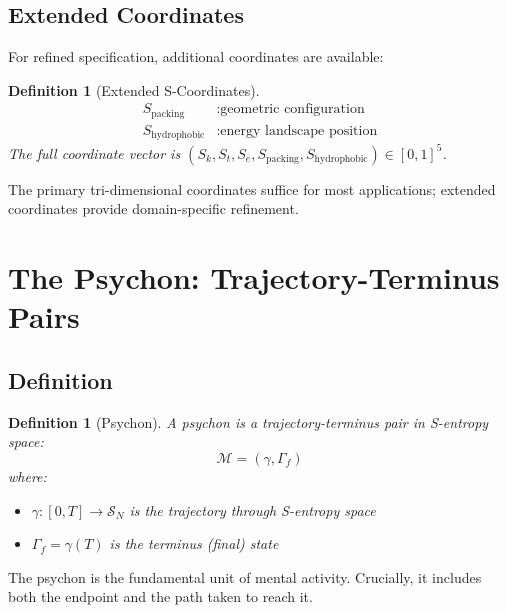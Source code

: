 \documentclass[twocolumn,amsmath,amssymb,aps,prl,superscriptaddress]{revtex4-2}
\newtheorem{definition}[theorem]{Definition}
\newcommand{\Sspace}{\mathcal{S}}
\newcommand{\Sk}{S_k}
\newcommand{\St}{S_t}
\newcommand{\Se}{S_e}
\newcommand{\Mstate}{\mathcal{M}}
\newcommand{\Gstate}{\Gamma}
\newcommand{\traj}{\gamma}
\begin{document}
\subsection{Extended Coordinates}

For refined specification, additional coordinates are available:

\begin{definition}[Extended S-Coordinates]
\begin{align}
S_{\text{packing}} &: \text{geometric configuration} \\
S_{\text{hydrophobic}} &: \text{energy landscape position}
\end{align}
The full coordinate vector is $(\Sk, \St, \Se, S_{\text{packing}}, S_{\text{hydrophobic}}) \in [0,1]^5$.
\end{definition}

The primary tri-dimensional coordinates suffice for most applications; extended coordinates provide domain-specific refinement.

\section{The Psychon: Trajectory-Terminus Pairs}
\label{sec:psychon}

\subsection{Definition}

\begin{definition}[Psychon]
\label{def:psychon}
A psychon is a trajectory-terminus pair in S-entropy space:
\begin{equation}
\boxed{\Mstate = (\traj, \Gstate_f)}
\end{equation}
where:
\begin{itemize}
\item $\traj: [0, T] \to \Sspace_N$ is the trajectory through S-entropy space
\item $\Gstate_f = \traj(T)$ is the terminus (final) state
\end{itemize}
\end{definition}

The psychon is the fundamental unit of mental activity. Crucially, it includes both the endpoint and the path taken to reach it.
\end{document}
